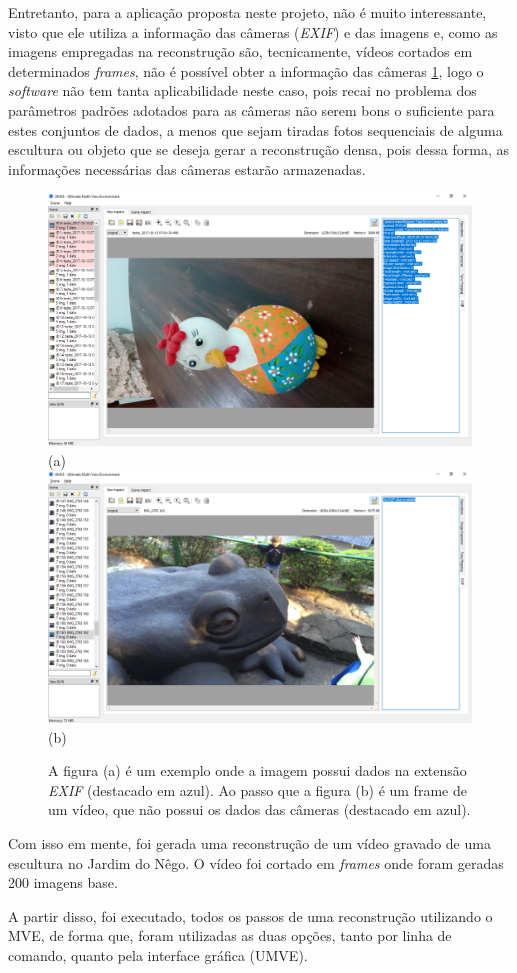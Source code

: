 Entretanto, para a aplicação proposta neste projeto, não é muito interessante, visto que ele utiliza a informação das câmeras ({\it EXIF}) e das imagens e, como as imagens empregadas na reconstrução são, tecnicamente, vídeos cortados em determinados {\it frames}, não é possível obter a informação das câmeras \ref{fig:mveexif}, logo o {\it software} não tem tanta aplicabilidade neste caso, pois recai no problema dos parâmetros padrões adotados para as câmeras não serem bons o suficiente para estes conjuntos de dados, a menos que sejam tiradas fotos sequenciais de alguma escultura ou objeto que se deseja gerar a reconstrução densa, pois dessa forma, as informações necessárias das câmeras estarão armazenadas.

\begin{figure}[!h]
	\centering
	\includegraphics[width=0.5\linewidth]{figs/exifumve.png}(a)
	\includegraphics[width=0.5\linewidth]{figs/exifsemumve.png}(b)
	\caption{%
	A figura (a) é um exemplo onde a imagem possui dados na extensão {\it EXIF} (destacado em azul). Ao passo que a figura (b) é um frame de um vídeo, que não possui os dados das câmeras (destacado em azul).
	}\label{fig:mveexif}
\end{figure} 

Com isso em mente, foi gerada uma reconstrução de um vídeo gravado de uma escultura no Jardim do Nêgo. O  vídeo foi cortado em {\it frames} onde foram geradas 200 imagens base. 

A partir disso, foi executado, todos os passos de uma reconstrução utilizando o MVE, de forma que, foram utilizadas as duas opções, tanto por linha de comando, quanto pela interface gráfica (UMVE).

